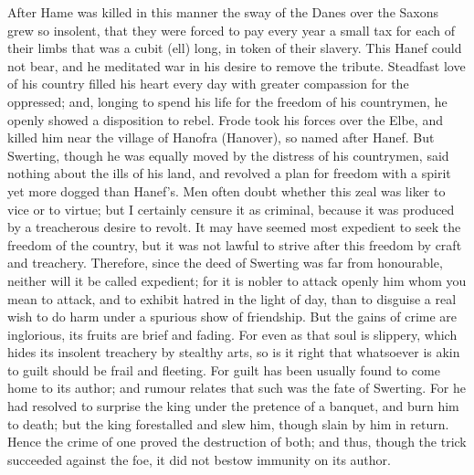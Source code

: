 \documentclass[10pt,a4paper]{report}
\begin{document}
After Hame was killed in this manner the sway of the Danes over the Saxons grew so insolent, that they were forced to pay every year a small tax for each of their limbs that was a cubit (ell) long, in token of their slavery. This Hanef could not bear, and he meditated war in his desire to remove the tribute. Steadfast love of his country filled his heart every day with greater compassion for the oppressed; and, longing to spend his life for the freedom of his countrymen, he openly showed a disposition to rebel. Frode took his forces over the Elbe, and killed him near the village of Hanofra (Hanover), so named after Hanef. But Swerting, though he was equally moved by the distress of his countrymen, said nothing about the ills of his land, and revolved a plan for freedom with a spirit yet more dogged than Hanef's. Men often doubt whether this zeal was liker to vice or to virtue; but I certainly censure it as criminal, because it was produced by a treacherous desire to revolt. It may have seemed most expedient to seek the freedom of the country, but it was not lawful to strive after this freedom by craft and treachery. Therefore, since the deed of Swerting was far from honourable, neither will it be called expedient; for it is nobler to attack openly him whom you mean to attack, and to exhibit hatred in the light of day, than to disguise a real wish to do harm under a spurious show of friendship. But the gains of crime are inglorious, its fruits are brief and fading. For even as that soul is slippery, which hides its insolent treachery by stealthy arts, so is it right that whatsoever is akin to guilt should be frail and fleeting. For guilt has been usually found to come home to its author; and rumour relates that such was the fate of Swerting. For he had resolved to surprise the king under the pretence of a banquet, and burn him to death; but the king forestalled and slew him, though slain by him in return. Hence the crime of one proved the destruction of both; and thus, though the trick succeeded against the foe, it did not bestow immunity on its author.\\
\end{document}
